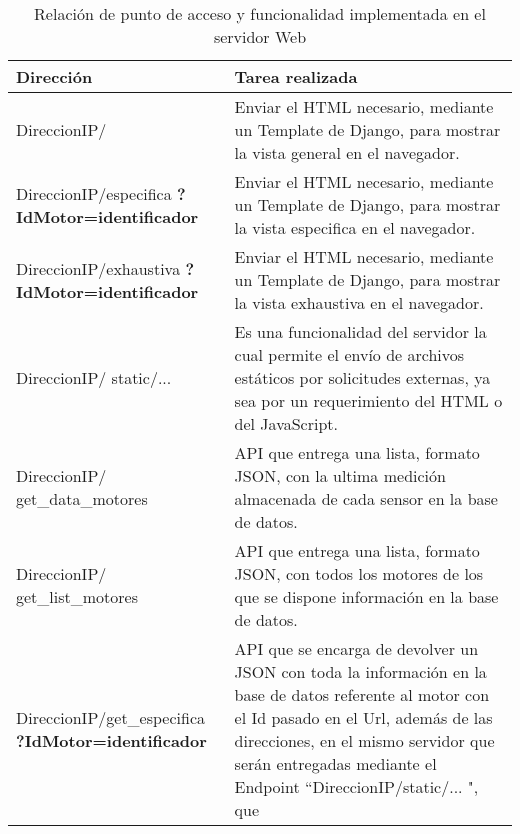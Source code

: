     \begin{table}[ht]
        \begin{center}
        \caption[Funciones Servidor Web]{ Relación de punto de acceso y
        funcionalidad implementada en el servidor Web }
        \label{tab:serWeb}

            \vspace{0.3cm}
            \begin{tabular}{|p{5cm}|p{10cm}|}
                \hline
                Dirección       & Tarea realizada
                \\\hline\hline
                DireccionIP/ &
                Enviar el HTML necesario, mediante un Template de Django,
                para mostrar la vista general en el navegador.
                \\\hline
                DireccionIP/especifica \textbf{?IdMotor=identificador}&
                Enviar el HTML necesario, mediante un Template de Django,
                para mostrar la vista especifica en el navegador.
                \\\hline
                DireccionIP/exhaustiva \textbf{?IdMotor=identificador}  &
                Enviar el HTML necesario, mediante un Template de Django,
                para mostrar la vista exhaustiva en el navegador.
                \\\hline
                DireccionIP/ static/... &
                Es una funcionalidad del servidor la cual permite el envío de
                archivos estáticos por solicitudes externas, ya sea por un
                requerimiento del HTML o del JavaScript.
                \\\hline
                DireccionIP/ get\_data\_motores &
                API que entrega  una lista, formato JSON,
                con la ultima medición almacenada de cada sensor en la base de
                datos.
                \\\hline
                DireccionIP/ get\_list\_motores &
                API que entrega una lista, formato JSON,
                con todos los motores de los que se
                dispone información en la base de datos.
                \\\hline
                DireccionIP/get\_especifica \textbf{?IdMotor=identificador}&
                API que se encarga de devolver un JSON con toda la información
                en la base de datos referente al motor con el Id pasado en el
                Url, además de las direcciones, en el mismo servidor que serán
                entregadas mediante el Endpoint ``DireccionIP/static/... ", que

\end{tabular}
\end{center}
\end{table}
